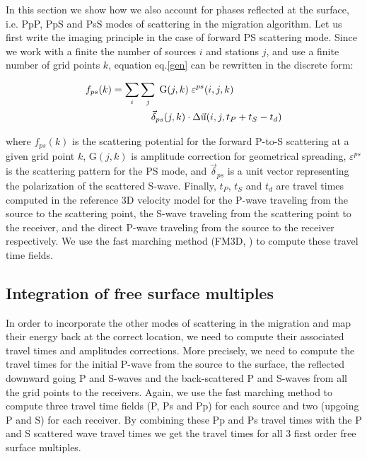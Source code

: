 \documentclass[10pt,a4paper]{article}
\numberwithin{equation}{section}
\begin{document}
In this section we show how we also account for phases reflected at the surface, i.e. PpP, PpS and PsS modes of scattering in the migration algorithm.
Let us first write the imaging principle in the case of forward PS scattering mode.
Since we work with a finite the number of sources $i$ and stations $j$, and use a finite number of grid points $k$, equation eq.\eqref{gen} can be rewritten in the discrete form:

\begin{align}
  f_{ps}(k) &= \sum_i \sum_j \; \text{G}(j,k) \; \varepsilon^{ps}(i,j,k) \; \notag\\&\qquad\qquad \vec{\delta}_{ps}(j,k) \cdot \Delta\vec{\text{u}}(i,j,t_P+t_S-t_d)
 \label{ps}
\end{align}
\vspace{1mm}

\noindent where $f_{ps}(k)$ is the scattering potential for the forward P-to-S scattering at a given grid point $k$,
G$(j,k)$ is amplitude correction for geometrical spreading, 
$\varepsilon^{ps}$ is the scattering pattern for the PS mode, 
and $\vec{\delta}_{ps}$ is a unit vector representing the polarization of the scattered S-wave.
Finally, $t_P$, $t_S$ and $t_d$ are travel times computed in the reference 3D velocity model for the P-wave traveling from the source to the scattering point, the S-wave traveling from the scattering point to the receiver, and the direct P-wave traveling  from the source to the receiver respectively.
We use the fast marching method (FM3D, \cite{deko_gji_06}) to compute these travel time fields.

\subsection{Integration of free surface multiples}

In order to incorporate the other modes of scattering in the migration and map their energy back at the correct location, we need to compute their associated travel times and amplitudes corrections.
More precisely, we need to compute the travel times for the initial P-wave from the source to the surface, the reflected downward going P and S-waves and the back-scattered P and S-waves from all the grid points to the receivers.
Again, we use the fast marching method to compute three travel time fields (P, Ps and Pp) for each source and two (upgoing P and S) for each receiver.
By combining these Pp and Ps travel times with the P and S scattered wave travel times we get the travel times for all 3 first order free surface multiples. 
\end{document}
